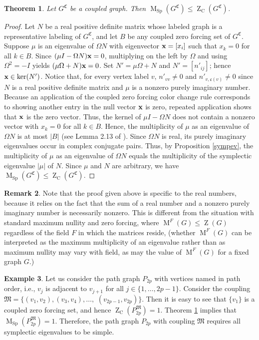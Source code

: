 \documentclass[12pt]{article}
\newtheorem{thm}{Theorem}[section]
\theoremstyle{definition}
\newtheorem{rem}[thm]{Remark}
\theoremstyle{definition}
\theoremstyle{definition}
\newtheorem{ex}[thm]{Example}
\numberwithin{figure}{section}
\numberwithin{equation}{section}
\newcommand{\GC}[2]{#1 ^ {\mathfrak #2}}
\newcommand{\pp}{\mathfrak{c}}
\newcommand{\MM}{\mathfrak{M}}
\newcommand{\bx}{{\bf x}}
\newcommand{\Z}{\operatorname{Z}}
\newcommand{\ZC}{\Z_{\operatorname{C}}}
\newcommand{\M}{\operatorname{M}}
\newcommand{\MC}{\M_{\operatorname{Sp}}}
\begin{document}
\begin{thm}\label{prop_zer_forc_vs_mult}
    Let $\GC G C$ be a coupled graph. Then $\MC(\GC G C) \leq \ZC(\GC G C)$.
\end{thm}
\begin{proof} 
    Let $N$ be a real positive definite matrix whose  labeled graph  is a representative labeling of $\GC G C$, and let $B$ be any coupled zero forcing set of $\GC G C$. 
    Suppose $\mu$ is an eigenvalue of $\Omega N$ with eigenvector $\bx=[x_i]$ such that $x_k = 0$ for all $k\in B$. 
     Since $(\mu I - \Omega N) \bx = 0$, multiplying on the left by $\Omega$ and using $\Omega^2 = -I$ yields $(\mu \Omega + N)\bx = 0$. Set $N' = \mu \Omega + N$ and $N'=[n'_{ij}]$; hence $\bx \in \ker(N')$. 
    Notice that, for every   vertex  label $v$, $n'_{vv} \neq 0$ and $n'_{v,\pp(v)} \neq 0$ since $N$ is a real positive definite matrix and  $\mu$ is a  nonzero  purely imaginary number.  Because an application of the coupled zero forcing color change rule corresponds to showing another entry in the null vector $\bx$ is zero, repeated application shows that  $\bx$ is the zero vector.  Thus, the kernel of $\mu I- \Omega N$ does not contain a nonzero vector with $x_k=0$ for all $k\in B$. Hence, the  multiplicity of $\mu$ as an eigenvalue of $\Omega N$ is at most $|B|$
    (see Lemma 2.13 of \cite{HLSbook}).   Since $\Omega N$ is real, its purely imaginary eigenvalues occur in complex conjugate pairs. Thus, by Proposition \ref{sympev}, the multiplicity of $\mu$ as an eigenvalue of $\Omega N$  equals the multiplicity of the symplectic eigenvalue $|\mu|$ of $N$. Since $\mu$ and $N$ are arbitrary, we have 
     $\MC(\GC G C) \leq \ZC(\GC G C)$. 
\end{proof}


\begin{rem}
    Note that  the proof given above is specific to the real numbers, because it relies on the fact that the sum of a real number and a nonzero purely imaginary number is necessarily nonzero. This is different from   the situation with standard maximum nullity and zero forcing, where $\M^F(G)\le\Z(G)$ regardless of the field $F$ in which the matrices reside,
    (whether $\M^F(G)$ can be interpreted as the maximum multiplicity of an eigenvalue rather than as maximum nullity {may}  vary with field, as {may}   the value of $\M^F(G)$ for a fixed graph $G$.)
\end{rem}




\begin{ex}\label{example_path_simple}
    Let us consider the path graph $P_{2p}$ with vertices  named  in path order, i.e., $v_j$ is adjacent to  $v_{j+1}$ for all $j \in \{1,\ldots,2p-1\}$. Consider the coupling ${\MM}= \{(v_1,v_2),(v_3,v_4),\ldots,$ $ (v_{2p-1},v_{2p})\}$. Then it is easy to see that $\{v_1\}$ is a coupled zero forcing set, and hence $\ZC(P_{2p}^{\MM}) = 1$. Theorem \ref{prop_zer_forc_vs_mult} implies that $\MC(P_{2p}^{\MM}) = 1$. Therefore, the path graph $P_{2p}$ with coupling $\MM$ requires all  symplectic eigenvalues to be simple. 
\end{ex}
\end{document}
